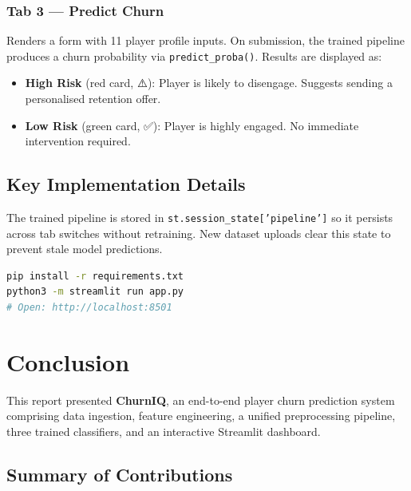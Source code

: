 \documentclass[12pt, a4paper]{article}
\begin{document}
\subsubsection{Tab 3 — Predict Churn}
Renders a form with 11 player profile inputs. On submission, the trained
pipeline produces a churn probability via \texttt{predict\_proba()}.
Results are displayed as:

\begin{itemize}
    \item \textbf{High Risk} (red card, ⚠️): Player is likely to disengage.
    Suggests sending a personalised retention offer.
    \item \textbf{Low Risk} (green card, ✅): Player is highly engaged.
    No immediate intervention required.
\end{itemize}

\subsection{Key Implementation Details}

\begin{infoblock}
The trained pipeline is stored in \texttt{st.session\_state['pipeline']}
so it persists across tab switches without retraining. New dataset uploads
clear this state to prevent stale model predictions.
\end{infoblock}

\begin{infoblock}
\begin{lstlisting}[language=bash, numbers=none]
pip install -r requirements.txt
python3 -m streamlit run app.py
# Open: http://localhost:8501
\end{lstlisting}
\end{infoblock}

\section{Conclusion}

This report presented \textbf{ChurnIQ}, an end-to-end player churn
prediction system comprising data ingestion, feature engineering,
a unified preprocessing pipeline, three trained classifiers, and an
interactive Streamlit dashboard.

\subsection{Summary of Contributions}
\end{document}
